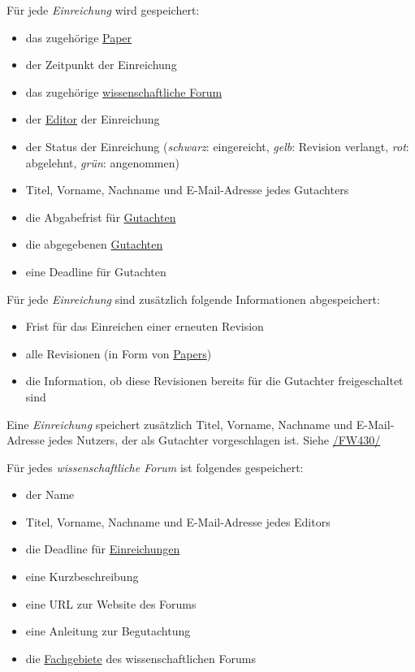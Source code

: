 \begin{description}
	 Für jede \emph{Einreichung} wird gespeichert:
	\begin{itemize}
		\item das zugehörige \hyperref[d020]{Paper}
		\item der Zeitpunkt der Einreichung
		\item das zugehörige \hyperref[d030]{wissenschaftliche Forum}
		\item der \hyperref[funkt:editor]{Editor} der Einreichung
		\item der Status der Einreichung (\emph{schwarz}: eingereicht, \emph{gelb}: Revision verlangt, \emph{rot}: abgelehnt, \emph{grün}: angenommen)
		\item Titel, Vorname, Nachname und E-Mail-Adresse jedes Gutachters
		\item die Abgabefrist für \hyperref[d040]{Gutachten}
		\item die abgegebenen \hyperref[d040]{Gutachten}
		\item eine Deadline für Gutachten
	\end{itemize}

	 Für jede \emph{Einreichung} sind zusätzlich folgende Informationen abgespeichert:
	\begin{itemize}
		\item Frist für das Einreichen einer erneuten Revision
		\item alle Revisionen (in Form von \hyperref[d020]{Papers})
		\item die Information, ob diese Revisionen bereits für die Gutachter freigeschaltet sind
	\end{itemize}

	 Eine \emph{Einreichung} speichert zusätzlich Titel, Vorname, Nachname und E-Mail-Adresse jedes Nutzers, der als Gutachter vorgeschlagen ist.
	Siehe \hyperref[funkt:430]{/FW430/}

	 Für jedes \emph{wissenschaftliche Forum} ist folgendes gespeichert:
	\begin{itemize}
		\item der Name
		\item Titel, Vorname, Nachname und E-Mail-Adresse jedes Editors
		\item die Deadline für \hyperref[d025]{Einreichungen}
		\item eine Kurzbeschreibung
		\item eine URL zur Website des Forums
		\item eine Anleitung zur Begutachtung
		\item die \hyperref[d035]{Fachgebiete} des wissenschaftlichen Forums
	\end{itemize}


\end{description}
